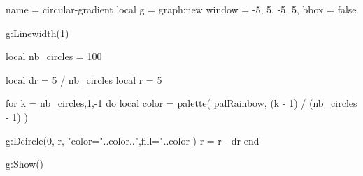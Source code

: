 \documentclass[12pt]{standalone}
\begin{document}
\begin{luadraw}{name = circular-gradient}
local g = graph:new{
  window = {-5, 5, -5, 5},
  bbox   = false
}

g:Linewidth(1)

local nb_circles = 100

local dr = 5 / nb_circles
local r  = 5

for k = nb_circles,1,-1 do
  local color = palette(
    palRainbow,
    (k - 1) / (nb_circles - 1)
  )

 g:Dcircle(0, r, 
   "color="..color..",fill="..color
   )
  r = r - dr
end

g:Show()
\end{luadraw}
\end{document}

